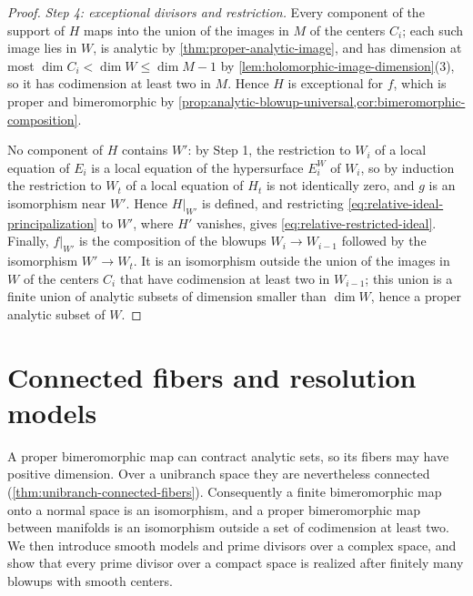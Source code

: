 \begin{proof}
\emph{Step 4: exceptional divisors and restriction.} Every component of the support of $H$ maps into the union of the images in $M$ of the centers $C_i$; each such image lies in $W$, is analytic by \cref{thm:proper-analytic-image}, and has dimension at most $\dim C_i<\dim W\leq\dim M-1$ by \cref{lem:holomorphic-image-dimension}(3), so it has codimension at least two in $M$. Hence $H$ is exceptional for $f$, which is proper and bimeromorphic by \cref{prop:analytic-blowup-universal,cor:bimeromorphic-composition}.

No component of $H$ contains $W'$: by Step 1, the restriction to $W_i$ of a local equation of $E_i$ is a local equation of the hypersurface $E^W_i$ of $W_i$, so by induction the restriction to $W_t$ of a local equation of $H_t$ is not identically zero, and $g$ is an isomorphism near $W'$. Hence $H|_{W'}$ is defined, and restricting \eqref{eq:relative-ideal-principalization} to $W'$, where $H'$ vanishes, gives \eqref{eq:relative-restricted-ideal}. Finally, $f|_{W'}$ is the composition of the blowups $W_i\to W_{i-1}$ followed by the isomorphism $W'\to W_t$. It is an isomorphism outside the union of the images in $W$ of the centers $C_i$ that have codimension at least two in $W_{i-1}$; this union is a finite union of analytic subsets of dimension smaller than $\dim W$, hence a proper analytic subset of $W$.
\end{proof}

\section{Connected fibers and resolution models}\label{sec:connected-fibers-models}

A proper bimeromorphic map can contract analytic sets, so its fibers may have positive dimension. Over a unibranch space they are nevertheless connected (\cref{thm:unibranch-connected-fibers}). Consequently a finite bimeromorphic map onto a normal space is an isomorphism, and a proper bimeromorphic map between manifolds is an isomorphism outside a set of codimension at least two. We then introduce smooth models and prime divisors over a complex space, and show that every prime divisor over a compact space is realized after finitely many blowups with smooth centers.

